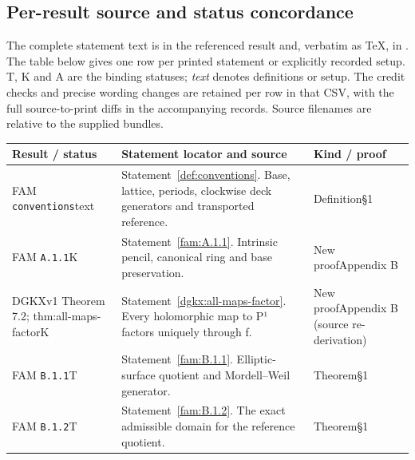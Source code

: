 \subsection{Per-result source and status concordance}\label{app:source-status}
The complete statement text is in the referenced result and, verbatim as TeX, in . The table below gives one row per printed statement or explicitly recorded setup. T, K and A are the binding statuses; \emph{text} denotes definitions or setup. The credit checks and precise wording changes are retained per row in that CSV, with the full source-to-print diffs in the accompanying records. Source filenames are relative to the supplied bundles.
\begingroup\small\setlength{\tabcolsep}{3pt}
\begin{longtable}{@{}L{.18\linewidth}L{.48\linewidth}L{.29\linewidth}@{}}
\toprule Result / status & Statement locator and source & Kind / proof\\\midrule\endhead
FAM \nolinkurl{conventions}\newline text & Statement~\ref{def:conventions}. Base, lattice, periods, clockwise deck generators and transported reference.\newline {} & Definition\newline §1\\
FAM \nolinkurl{A.1.1}\newline K & Statement~\ref{fam:A.1.1}. Intrinsic pencil, canonical ring and base preservation.\newline {} & New proof\newline Appendix B\\
DGKXv1 Theorem 7.2; thm:\allowbreak{}all-maps-factor\newline K & Statement~\ref{dgkx:all-maps-factor}. Every holomorphic map to P¹ factors uniquely through f.\newline {} & New proof\newline Appendix B (source re-derivation)\\
FAM \nolinkurl{B.1.1}\newline T & Statement~\ref{fam:B.1.1}. Elliptic-surface quotient and Mordell--Weil generator.\newline {} & Theorem\newline §1\\
FAM \nolinkurl{B.1.2}\newline T & Statement~\ref{fam:B.1.2}. The exact admissible domain for the reference quotient.\newline {} & Theorem\newline §1\\

\end{longtable}
